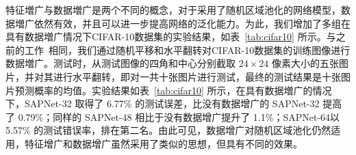 特征増广与数据増广是两个不同的概念，对于采用了随机区域池化的网络模型，数据増广依然有效，并且可以进一步提高网络的泛化能力。为此，我们增加了多组在具有数据増广情况下CIFAR-10数据集的实验结果，如表~\ref{tab:cifar10} 所示。与之前的工作~\cite{goodfellow2013maxout,springenberg2013improving,stollenga2014deep,wan2013regularization,DBLP:journals/corr/LinCY13,lee2014deeply,liang2015recurrent,srivastava2015training,springenberg2014striving}相同，我们通过随机平移和水平翻转对CIFAR-10数据集的训练图像进行数据増广。测试时，从测试图像的四角和中心分别截取 $24\times24$ 像素大小的五张图片，并对其进行水平翻转，即对一共十张图片进行测试，最终的测试结果是十张图片预测概率的均值。实验结果如表~\ref{tab:cifar10} 所示，在具有数据増广的情况下，SAPNet-32 取得了 6.77\% 的测试误差，比没有数据增广的 SAPNet-32 提高了 0.79\%；同样的 SAPNet-48 相比于没有数据增广提升了 1.1\%；SAPNet-64以 5.57\% 的测试错误率，排在第二名。由此可见，数据增广对随机区域池化仍然适用，特征增广和数据增广虽然采用了类似的思想，但具有不同的效果。

